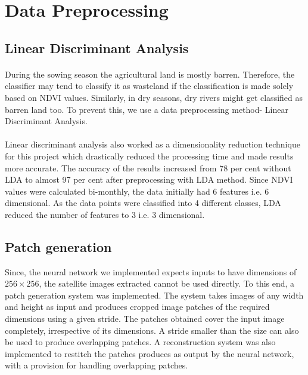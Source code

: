\documentclass[12pt, a4paper]{report}
\begin{document}
\section{Data Preprocessing}
\subsection{Linear Discriminant Analysis}
\paragraph{}
 During the sowing season the agricultural land is mostly barren. Therefore, the classifier may tend to classify it as wasteland if the classification is made solely based on NDVI values. Similarly, in dry seasons, dry rivers might get classified as barren land too. To prevent this, we use a data preprocessing method- Linear Discriminant Analysis.
\paragraph{}
Linear discriminant analysis also worked as a dimensionality reduction technique for this project which drastically reduced the processing time and made results more accurate. The accuracy of the results increased from 78 per cent without LDA to almost 97 per cent after preprocessing with LDA method. Since NDVI values were calculated bi-monthly, the data initially had 6 features i.e. 6 dimensional. As the data points were classified into 4 different classes, LDA reduced the number of features to 3 i.e. 3 dimensional.
\subsection{Patch generation}
Since, the neural network we implemented expects inputs to have dimensions of $256 \times 256$, the satellite images extracted cannot be used directly. To this end, a patch generation system was implemented. The system takes images of any width and height as input and produces cropped image patches of the required dimensions using a given stride. The patches obtained cover the input image completely, irrespective of its dimensions. A stride smaller than the size can also be used to produce overlapping patches. A reconstruction system was also implemented to restitch the patches produces as output by the neural network, with a provision for handling overlapping patches.
\end{document}

